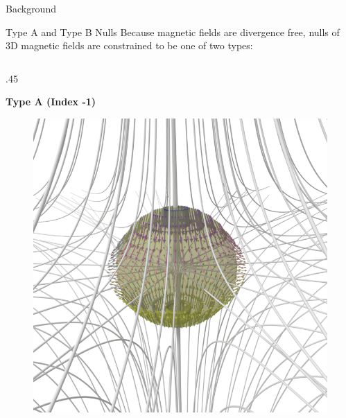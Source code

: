 \documentclass[final]{beamer}
\newlength{\onecolwid}
\begin{document}
\begin{frame}[t]
\begin{columns}[t]
\begin{column}{\onecolwid}
\begin{block}{\huge{Background}}
\begin{block}{Type A and Type B Nulls}
  Because magnetic fields are divergence free,
  nulls of 3D magnetic fields are constrained to be one of two types:
  \begin{columns}[t,totalwidth=\onecolwid] %
    \begin{column}{.45\onecolwid}
        \begin{centering}
        \textbf{Type A (Index -1)}
        \begin{figure}
        \includegraphics[width=.45\onecolwid]{fig/negindex_start.png}
        \end{figure}
        \end{centering}
    \end{column}


\end{columns}
\end{block}
\end{block}
\end{column}
\end{columns}
\end{frame}
\end{document}

